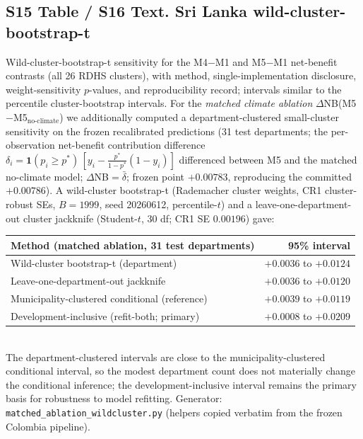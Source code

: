 \documentclass[11pt,a4paper]{article}
\begin{document}
\subsection*{S15 Table / S16 Text. Sri Lanka wild-cluster-bootstrap-t}
Wild-cluster-bootstrap-t sensitivity for the M4$-$M1 and M5$-$M1 net-benefit contrasts (all 26 RDHS clusters), with method, single-implementation disclosure, weight-sensitivity $p$-values, and reproducibility record; intervals similar to the percentile cluster-bootstrap intervals. For the \emph{matched climate ablation} $\Delta$NB(M5$-$M5$_{\text{no-climate}}$) we additionally computed a department-clustered small-cluster sensitivity on the frozen recalibrated predictions (31 test departments; the per-observation net-benefit contribution difference $\delta_i=\mathbf{1}(p_i\!\ge\!p^*)\,[y_i-\tfrac{p^*}{1-p^*}(1-y_i)]$ differenced between M5 and the matched no-climate model; $\Delta$NB$=\bar\delta$; frozen point $+0.00783$, reproducing the committed $+0.00786$). A wild-cluster bootstrap-t (Rademacher cluster weights, CR1 cluster-robust SEs, $B=1999$, seed 20260612, percentile-$t$) and a leave-one-department-out cluster jackknife (Student-$t$, 30 df; CR1 SE $0.00196$) gave:\\[0.3em]
{\footnotesize\begin{tabular}{@{}lr@{}}
\toprule
Method (matched ablation, 31 test departments) & 95\% interval \\
\midrule
Wild-cluster bootstrap-t (department) & $+0.0036$ to $+0.0124$ \\
Leave-one-department-out jackknife & $+0.0036$ to $+0.0120$ \\
Municipality-clustered conditional (reference) & $+0.0039$ to $+0.0119$ \\
Development-inclusive (refit-both; primary) & $+0.0008$ to $+0.0209$ \\
\bottomrule
\end{tabular}}\\[0.3em]
The department-clustered intervals are close to the municipality-clustered conditional interval, so the modest department count does not materially change the conditional inference; the development-inclusive interval remains the primary basis for robustness to model refitting. Generator: \texttt{matched\_ablation\_wildcluster.py} (helpers copied verbatim from the frozen Colombia pipeline).
\end{document}
